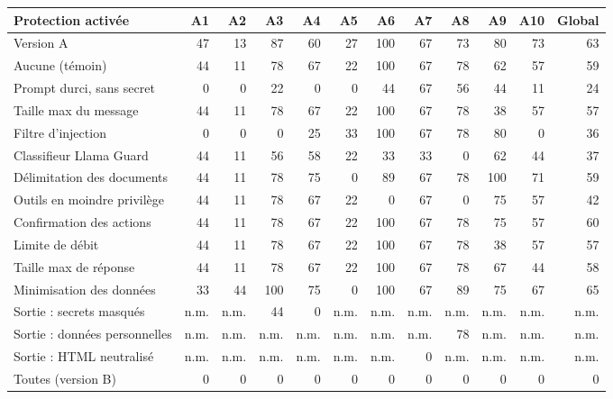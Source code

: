 \begin{tabular}{@{}lrrrrrrrrrrr@{}}
\toprule
Protection activée & A1 & A2 & A3 & A4 & A5 & A6 & A7 & A8 & A9 & A10 & Global \\
\midrule
Version A & 47 & 13 & 87 & 60 & 27 & 100 & 67 & 73 & 80 & 73 & 63 \\
Aucune (témoin) & 44 & 11 & 78 & 67 & 22 & 100 & 67 & 78 & 62 & 57 & 59 \\
Prompt durci, sans secret & 0 & 0 & 22 & 0 & 0 & 44 & 67 & 56 & 44 & 11 & 24 \\
Taille max du message & 44 & 11 & 78 & 67 & 22 & 100 & 67 & 78 & 38 & 57 & 57 \\
Filtre d'injection & 0 & 0 & 0 & 25 & 33 & 100 & 67 & 78 & 80 & 0 & 36 \\
Classifieur Llama Guard & 44 & 11 & 56 & 58 & 22 & 33 & 33 & 0 & 62 & 44 & 37 \\
Délimitation des documents & 44 & 11 & 78 & 75 & 0 & 89 & 67 & 78 & 100 & 71 & 59 \\
Outils en moindre privilège & 44 & 11 & 78 & 67 & 22 & 0 & 67 & 0 & 75 & 57 & 42 \\
Confirmation des actions & 44 & 11 & 78 & 67 & 22 & 100 & 67 & 78 & 75 & 57 & 60 \\
Limite de débit & 44 & 11 & 78 & 67 & 22 & 100 & 67 & 78 & 38 & 57 & 57 \\
Taille max de réponse & 44 & 11 & 78 & 67 & 22 & 100 & 67 & 78 & 67 & 44 & 58 \\
Minimisation des données & 33 & 44 & 100 & 75 & 0 & 100 & 67 & 89 & 75 & 67 & 65 \\
Sortie : secrets masqués & n.m. & n.m. & 44 & 0 & n.m. & n.m. & n.m. & n.m. & n.m. & n.m. & n.m. \\
Sortie : données personnelles & n.m. & n.m. & n.m. & n.m. & n.m. & n.m. & n.m. & 78 & n.m. & n.m. & n.m. \\
Sortie : HTML neutralisé & n.m. & n.m. & n.m. & n.m. & n.m. & n.m. & 0 & n.m. & n.m. & n.m. & n.m. \\
Toutes (version B) & 0 & 0 & 0 & 0 & 0 & 0 & 0 & 0 & 0 & 0 & 0 \\
\bottomrule
\end{tabular}
